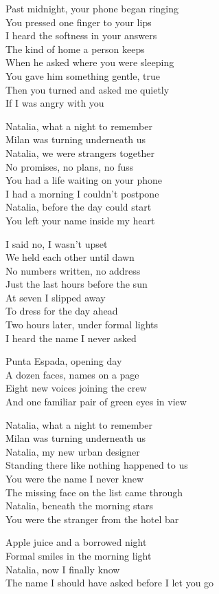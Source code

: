 \begin{lyrics}
Past midnight, your phone began ringing\\
You pressed one finger to your lips\\
I heard the softness in your answers\\
The kind of home a person keeps\\
When he asked where you were sleeping\\
You gave him something gentle, true\\
Then you turned and asked me quietly\\
If I was angry with you

Natalia, what a night to remember\\
Milan was turning underneath us\\
Natalia, we were strangers together\\
No promises, no plans, no fuss\\
You had a life waiting on your phone\\
I had a morning I couldn't postpone\\
Natalia, before the day could start\\
You left your name inside my heart

I said no, I wasn't upset\\
We held each other until dawn\\
No numbers written, no address\\
Just the last hours before the sun\\
At seven I slipped away\\
To dress for the day ahead\\
Two hours later, under formal lights\\
I heard the name I never asked

Punta Espada, opening day\\
A dozen faces, names on a page\\
Eight new voices joining the crew\\
And one familiar pair of green eyes in view

Natalia, what a night to remember\\
Milan was turning underneath us\\
Natalia, my new urban designer\\
Standing there like nothing happened to us\\
You were the name I never knew\\
The missing face on the list came through\\
Natalia, beneath the morning stars\\
You were the stranger from the hotel bar

Apple juice and a borrowed night\\
Formal smiles in the morning light\\
Natalia, now I finally know\\
The name I should have asked before I let you go
\end{lyrics}

